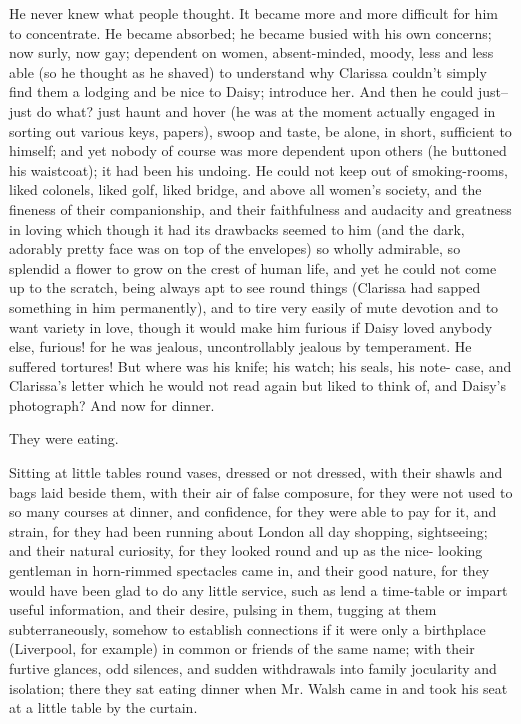 \documentclass[lang=cn,10pt]{elegantbook}
\begin{document}
He never knew what people thought.  It became more and more
difficult for him to concentrate.  He became absorbed; he became
busied with his own concerns; now surly, now gay; dependent on
women, absent-minded, moody, less and less able (so he thought as
he shaved) to understand why Clarissa couldn't simply find them a
lodging and be nice to Daisy; introduce her.  And then he could
just--just do what? just haunt and hover (he was at the moment
actually engaged in sorting out various keys, papers), swoop and
taste, be alone, in short, sufficient to himself; and yet nobody of
course was more dependent upon others (he buttoned his waistcoat);
it had been his undoing.  He could not keep out of smoking-rooms,
liked colonels, liked golf, liked bridge, and above all women's
society, and the fineness of their companionship, and their
faithfulness and audacity and greatness in loving which though it
had its drawbacks seemed to him (and the dark, adorably pretty face
was on top of the envelopes) so wholly admirable, so splendid a
flower to grow on the crest of human life, and yet he could not
come up to the scratch, being always apt to see round things
(Clarissa had sapped something in him permanently), and to tire
very easily of mute devotion and to want variety in love, though it
would make him furious if Daisy loved anybody else, furious! for he
was jealous, uncontrollably jealous by temperament.  He suffered
tortures!  But where was his knife; his watch; his seals, his note-
case, and Clarissa's letter which he would not read again but liked
to think of, and Daisy's photograph?  And now for dinner.

They were eating.

Sitting at little tables round vases, dressed or not dressed, with
their shawls and bags laid beside them, with their air of false
composure, for they were not used to so many courses at dinner, and
confidence, for they were able to pay for it, and strain, for they
had been running about London all day shopping, sightseeing; and
their natural curiosity, for they looked round and up as the nice-
looking gentleman in horn-rimmed spectacles came in, and their good
nature, for they would have been glad to do any little service,
such as lend a time-table or impart useful information, and their
desire, pulsing in them, tugging at them subterraneously, somehow
to establish connections if it were only a birthplace (Liverpool,
for example) in common or friends of the same name; with their
furtive glances, odd silences, and sudden withdrawals into family
jocularity and isolation; there they sat eating dinner when Mr.
Walsh came in and took his seat at a little table by the curtain.
\end{document}
